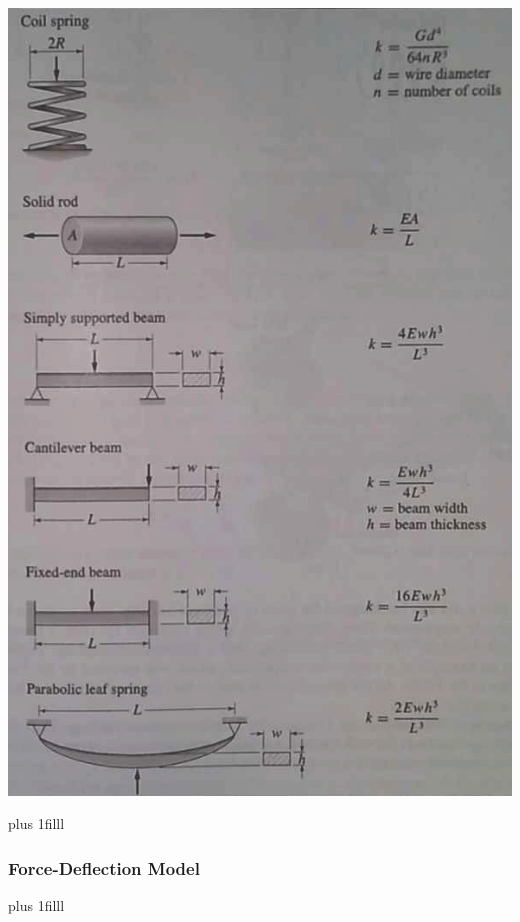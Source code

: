 \documentclass[fleqn]{beamer} %
\newcommand{\sectionIsubsectionIItitle}{Force-Deflection Model}
\newcommand{\btVFill}{\vskip0pt plus 1filll}
\begin{document}
\begin{frame}
\begin{multicols}{2}
					\includegraphics[scale=.2]{images/types_of_springs.png}
				\end{multicols}
							
				\btVFill
				
			\end{frame}

			\begin{frame}
				\frametitle{\sectionIsubsectionIItitle}\small
				\bigskip


				\btVFill
				

			\end{frame}

\end{document}
